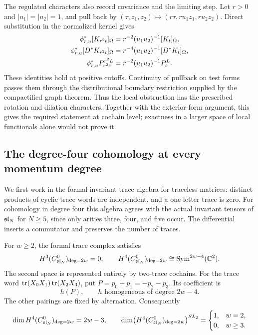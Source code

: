 The regulated characters also record covariance and the limiting
step.  Let $r>0$ and
$|u_1|=|u_2|=1$, and pull back by
$(\tau,z_1,z_2)\mapsto(r\tau,ru_1z_1,ru_2z_2)$.  Direct substitution
in the normalized kernel gives
\begin{align}
  \phi_{r,u}^*[K_{r^2t}]_\Omega
    &=r^{-2}(u_1u_2)^{-1}[K_t]_\Omega,\notag\\
  \phi_{r,u}^*[D^*K_{r^2t}]_\Omega
    &=r^{-4}(u_1u_2)^{-1}[D^*K_t]_\Omega,\notag\\
  \phi_{r,u}^*P_{r^2\varepsilon}^{r^2L}
    &=r^{-2}(u_1u_2)^{-1}P_\varepsilon^L.
  \label{eq:regulated-covariance-all-orders}
\end{align}
These identities hold at positive cutoffs.  Continuity of pullback
on test forms passes them through the distributional boundary
restriction supplied by the compactified graph theorem.  Thus the
local obstruction has the prescribed rotation and dilation
characters.  Together with the exterior-form argument, this gives
the required statement at cochain level; exactness
in a larger space of local functionals alone would not prove it.

\subsection{The degree-four cohomology at every momentum degree}

We first work in the formal invariant trace algebra for traceless
matrices: distinct products of cyclic trace words are independent,
and a one-letter trace is zero.  For cohomology in degree four this
algebra agrees with the actual invariant tensors of $\mathfrak{sl}_N$ for
$N\ge5$, since only arities three, four, and five occur.  The
differential inserts a commutator and preserves the number of traces.

\begin{proposition}
\label{prop:all-order-h4}
For $w\ge2$, the formal trace complex satisfies
\begin{equation}
  H^3(C^0_{\mathfrak{sl}_N})_{\deg=2w}=0,
  \qquad
  H^4(C^0_{\mathfrak{sl}_N})_{\deg=2w}
       \cong\operatorname{Sym}^{2w-4}(\mathbb C^2).
  \label{eq:all-order-cohomology}
\end{equation}
The second space is represented entirely by two-trace cochains.
For the trace word $\operatorname{tr}(X_0X_1)\operatorname{tr}(X_2X_3)$, put
$P=p_0+p_1=-p_2-p_3$.  Its coefficient is
\begin{equation}
  [p_0P][p_2P]h(P),
  \qquad h\text{ homogeneous of degree }2w-4.
  \label{eq:all-order-double-trace}
\end{equation}
The other pairings are fixed by alternation.  Consequently
\begin{equation}
 \dim H^4(C^0_{\mathfrak{sl}_N})_{\deg=2w}=2w-3,
 \qquad
 \dim\bigl(H^4(C^0_{\mathfrak{sl}_N})_{\deg=2w}\bigr)^{SL_2}
 =\begin{cases}1,&w=2,\\0,&w\ge3.\end{cases}
 \label{eq:all-order-invariant-vanishing}
\end{equation}
\end{proposition}

